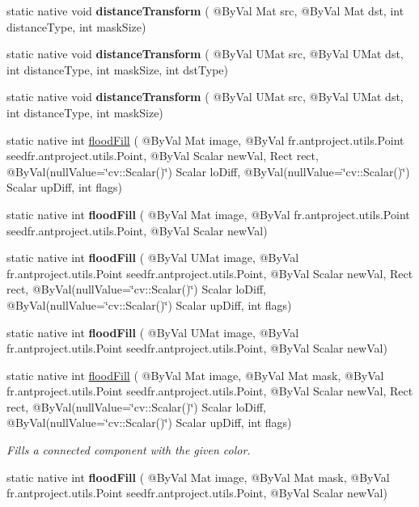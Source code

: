 \begin{DoxyCompactItemize}
\item 
static native void {\bfseries distance\+Transform} ( @By\+Val Mat src, @By\+Val Mat dst, int distance\+Type, int mask\+Size)
\item 
static native void {\bfseries distance\+Transform} ( @By\+Val U\+Mat src, @By\+Val U\+Mat dst, int distance\+Type, int mask\+Size, int dst\+Type)
\item 
static native void {\bfseries distance\+Transform} ( @By\+Val U\+Mat src, @By\+Val U\+Mat dst, int distance\+Type, int mask\+Size)
\item 
static native int \hyperlink{group__imgproc__misc_gacd62f4ba0b1bf1f4664bfd1a3dd1bd08}{flood\+Fill} ( @By\+Val Mat image, @By\+Val fr.antproject.utils.Point seed\+fr.antproject.utils.Point, @By\+Val Scalar new\+Val, Rect rect, @By\+Val(null\+Value=\char`\"{}cv\+::\+Scalar()\char`\"{}) Scalar lo\+Diff, @By\+Val(null\+Value=\char`\"{}cv\+::\+Scalar()\char`\"{}) Scalar up\+Diff, int flags)
\item 
static native int {\bfseries flood\+Fill} ( @By\+Val Mat image, @By\+Val fr.antproject.utils.Point seed\+fr.antproject.utils.Point, @By\+Val Scalar new\+Val)
\item 
static native int {\bfseries flood\+Fill} ( @By\+Val U\+Mat image, @By\+Val fr.antproject.utils.Point seed\+fr.antproject.utils.Point, @By\+Val Scalar new\+Val, Rect rect, @By\+Val(null\+Value=\char`\"{}cv\+::\+Scalar()\char`\"{}) Scalar lo\+Diff, @By\+Val(null\+Value=\char`\"{}cv\+::\+Scalar()\char`\"{}) Scalar up\+Diff, int flags)
\item 
static native int {\bfseries flood\+Fill} ( @By\+Val U\+Mat image, @By\+Val fr.antproject.utils.Point seed\+fr.antproject.utils.Point, @By\+Val Scalar new\+Val)
\item 
static native int \hyperlink{group__imgproc__misc_gae1a712c481241605487f34e3b969f49c}{flood\+Fill} ( @By\+Val Mat image, @By\+Val Mat mask, @By\+Val fr.antproject.utils.Point seed\+fr.antproject.utils.Point, @By\+Val Scalar new\+Val, Rect rect, @By\+Val(null\+Value=\char`\"{}cv\+::\+Scalar()\char`\"{}) Scalar lo\+Diff, @By\+Val(null\+Value=\char`\"{}cv\+::\+Scalar()\char`\"{}) Scalar up\+Diff, int flags)
\begin{DoxyCompactList}\small\item\em Fills a connected component with the given color. \end{DoxyCompactList}\item 
static native int {\bfseries flood\+Fill} ( @By\+Val Mat image, @By\+Val Mat mask, @By\+Val fr.antproject.utils.Point seed\+fr.antproject.utils.Point, @By\+Val Scalar new\+Val)

\end{DoxyCompactItemize}
